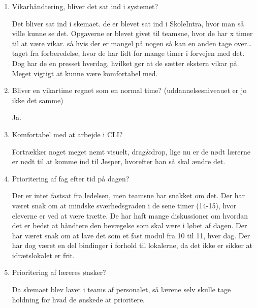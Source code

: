 \begin{enumerate}
	\item Vikarhåndtering, bliver det sat ind i systemet?
	
	Det bliver sat ind i skemaet. de er blevet sat ind i SkoleIntra, hvor man så ville kunne se det. Opgaverne er blevet givet til teamsne, hvor de har x timer til at være vikar. så hvis der er mangel på nogen så kan en anden tage over\ldots taget fra forberedelse, hvor de har lidt for mange timer i forvejen med det. Dog har de en presset hverdag, hvilket gør at de sætter ekstern vikar på. Meget vigtigt at kunne være komfortabel med. 
	
	\item Bliver en vikartime regnet som en normal time? (uddannelsesniveauet er jo ikke det samme)
	
	Ja.
	
	\item Komfortabel med at arbejde i CLI?
	
	Fortrækker noget meget nemt visuelt, drag\&drop, lige nu er de nødt lærerne er nødt til at komme ind til Jesper, hvorefter han så skal ændre det.
	
	\item Prioritering af fag efter tid på dagen?
	
	Der er intet fastsat fra ledelsen, men teamsne har snakket om det. Der har været snak om at mindske sværhedsgraden i de sene timer (14-15), hvor eleverne er ved at være trætte. De har haft mange diskussioner om hvordan det er bedst at håndtere den bevægelse som skal være i løbet af dagen. Der har været snak om at lave det som et fast modul fra 10 til 11, hver dag. Der har dog været en del bindinger i forhold til lokalerne, da det ikke er sikker at idrætslokalet er frit.
	

	\item Prioritering af læreres ønsker?

	Da skemaet blev lavet i teams af personalet, så lærene selv skulle tage holdning for hvad de ønskede at prioritere.  
	
\end{enumerate}